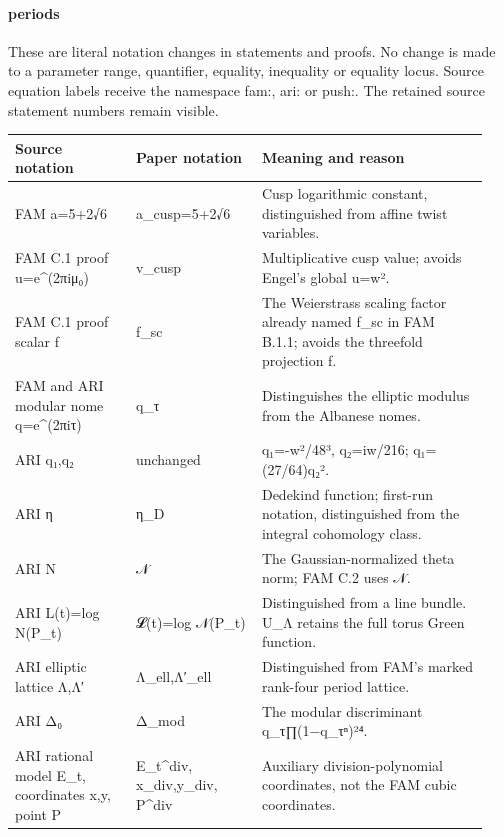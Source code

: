 \documentclass[11pt,a4paper]{article}
\theoremstyle{plain}
\theoremstyle{definition}
\begin{document}
\paragraph{periods}
These are literal notation changes in statements and proofs. No change is made to a parameter range, quantifier, equality, inequality or equality locus. Source equation labels receive the namespace fam:\allowbreak{}, ari:\allowbreak{} or push:\allowbreak{}. The retained source statement numbers remain visible.
\begingroup\small\setlength{\tabcolsep}{3pt}\begin{longtable}{@{}L{0.24\linewidth}L{0.25\linewidth}L{0.45\linewidth}@{}}\toprule
Source notation & Paper notation & Meaning and reason\\\midrule\endhead
FAM a=5+2√6 & a\_\allowbreak{}cusp=5+2√6 & Cusp logarithmic constant, distinguished from affine twist variables.\\
FAM C.1 proof u=e\textasciicircum{}(2πiμ₀) & v\_\allowbreak{}cusp & Multiplicative cusp value; avoids Engel's global u=w².\\
FAM C.1 proof scalar f & f\_\allowbreak{}sc & The Weierstrass scaling factor already named f\_\allowbreak{}sc in FAM B.1.1; avoids the threefold projection f.\\
FAM and ARI modular nome q=e\textasciicircum{}(2πiτ) & q\_\allowbreak{}τ & Distinguishes the elliptic modulus from the Albanese nomes.\\
ARI q₁,q₂ & unchanged & q₁=-w²/\allowbreak{}48³, q₂=iw/\allowbreak{}216; q₁=(27/\allowbreak{}64)q₂².\\
ARI η & η\_\allowbreak{}D & Dedekind function; first-run notation, distinguished from the integral cohomology class.\\
ARI N & 𝒩 & The Gaussian-normalized theta norm; FAM C.2 uses 𝒩.\\
ARI L(t)=log N(P\_\allowbreak{}t) & 𝓛(t)=log 𝒩(P\_\allowbreak{}t) & Distinguished from a line bundle. U\_\allowbreak{}Λ retains the full torus Green function.\\
ARI elliptic lattice Λ,Λ′ & Λ\_\allowbreak{}ell,Λ′\_\allowbreak{}ell & Distinguished from FAM's marked rank-four period lattice.\\
ARI Δ₀ & Δ\_\allowbreak{}mod & The modular discriminant q\_\allowbreak{}τ∏(1−q\_\allowbreak{}τⁿ)²⁴.\\
ARI rational model E\_\allowbreak{}t, coordinates x,y, point P & E\_\allowbreak{}t\textasciicircum{}div, x\_\allowbreak{}div,y\_\allowbreak{}div, P\textasciicircum{}div & Auxiliary division-polynomial coordinates, not the FAM cubic coordinates.\\

\end{longtable}
\end{document}
